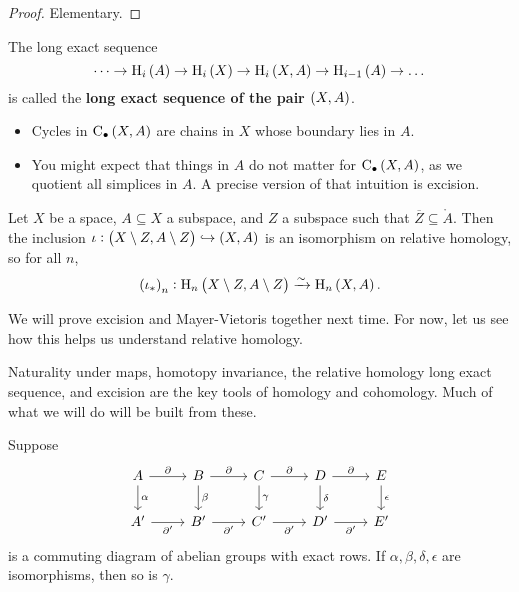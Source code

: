 \begin{proof}
Elementary.
\end{proof}

The long exact sequence
$$ \dots \to \H_i\br{A} \to \H_i\br{X} \to \H_i\br{X, A} \to \H_{i - 1}\br{A} \to \dots $$
is called the \textbf{long exact sequence of the pair $ \br{X, A} $}.

\begin{remark*}
\hfill
\begin{itemize}
\item Cycles in $ \C_\bullet\br{X, A} $ are chains in $ X $ whose boundary lies in $ A $.
\item You might expect that things in $ A $ do not matter for $ \C_\bullet\br{X, A} $, as we quotient all simplices in $ A $. A precise version of that intuition is excision.
\end{itemize}
\end{remark*}

\begin{theorem}[Excision]
Let $ X $ be a space, $ A \subseteq X $ a subspace, and $ Z $ a subspace such that $ \overline{Z} \subseteq \mathring{A} $. Then the inclusion $ \iota : \br{X \setminus Z, A \setminus Z} \hookrightarrow \br{X, A} $ is an isomorphism on relative homology, so for all $ n $,
$$ \br{\iota_*}_n : \H_n\br{X \setminus Z, A \setminus Z} \xrightarrow{\sim} \H_n\br{X, A}. $$
\end{theorem}

We will prove excision and Mayer-Vietoris together next time. For now, let us see how this helps us understand relative homology.

\begin{remark*}
Naturality under maps, homotopy invariance, the relative homology long exact sequence, and excision are the key tools of homology and cohomology. Much of what we will do will be built from these.
\end{remark*}

\begin{lemma}[$ 5 $-lemma]
Suppose
$$
\begin{tikzcd}
A \arrow{r}{\da} \arrow{d}{\alpha} & B \arrow{r}{\da} \arrow{d}{\beta} & C \arrow{r}{\da} \arrow{d}{\gamma} & D \arrow{r}{\da} \arrow{d}{\delta} & E \arrow{d}{\epsilon} \\
A' \arrow{r}[swap]{\da'} & B' \arrow{r}[swap]{\da'} & C' \arrow{r}[swap]{\da'} & D' \arrow{r}[swap]{\da'} & E'
\end{tikzcd}
$$
is a commuting diagram of abelian groups with exact rows. If $ \alpha, \beta, \delta, \epsilon $ are isomorphisms, then so is $ \gamma $.
\end{lemma}

